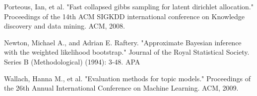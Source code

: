 \documentclass[twoside,12pt]{article}
\begin{document}
\begin{thebibliography}{9}
Porteous, Ian, et al. "Fast collapsed gibbs sampling for latent dirichlet allocation." Proceedings of the 14th ACM SIGKDD international conference on Knowledge discovery and data mining. ACM, 2008.


Newton, Michael A., and Adrian E. Raftery. "Approximate Bayesian inference with the weighted likelihood bootstrap." Journal of the Royal Statistical Society. Series B (Methodological) (1994): 3-48.
APA	

Wallach, Hanna M., et al. "Evaluation methods for topic models." Proceedings of the 26th Annual International Conference on Machine Learning. ACM, 2009.

\end{thebibliography}
\end{document}
